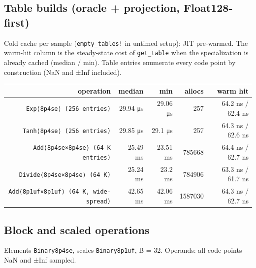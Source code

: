 \subsection{Table builds (oracle + projection, Float128-first)}



\label{17249747280115456051}{}


Cold cache per sample (\texttt{empty\_tables!} in untimed setup); JIT pre-warmed. The warm-hit column is the steady-state cost of \texttt{get\_table} when the specialization is already cached (median / min). Table entries enumerate every code point by construction (NaN and ±Inf included).




\begin{table}[h]
\centering
\begin{tabulary}{\linewidth}{R R R R R}
\toprule
operation & median & min & allocs & warm hit \\
\toprule
\texttt{Exp⟨8p4se⟩ (256 entries)} & 29.94 μs & 29.06 μs & 257 & 64.2 ns / 62.4 ns \\
\texttt{Tanh⟨8p4se⟩ (256 entries)} & 29.85 μs & 29.1 μs & 257 & 64.3 ns / 62.6 ns \\
\texttt{Add⟨8p4se×8p4se⟩ (64 K entries)} & 25.49 ms & 23.51 ms & 785668 & 64.4 ns / 62.7 ns \\
\texttt{Divide⟨8p4se×8p4se⟩ (64 K)} & 25.24 ms & 23.2 ms & 784906 & 63.3 ns / 61.7 ns \\
\texttt{Add⟨8p1uf×8p1uf⟩ (64 K, wide-spread)} & 42.65 ms & 42.06 ms & 1587030 & 64.3 ns / 62.7 ns \\
\bottomrule
\end{tabulary}

\end{table}



\subsection{Block and scaled operations}



\label{17033350743052450193}{}


Elements \texttt{Binary8p4se}, scales \texttt{Binary8p1uf}, B = 32. Operands: all code points — NaN and ±Inf sampled.




